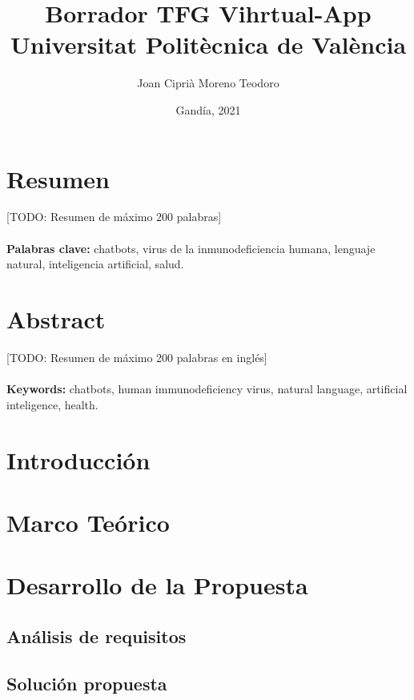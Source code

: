 \documentclass[11pt,a4paper]{book}
\title{
{Borrador TFG Vihrtual-App}\\
{\large Universitat Politècnica de València}\\
}
\author{Joan Ciprià Moreno Teodoro}
\date{Gandía, 2021}
\begin{document}
\maketitle

\chapter*{Resumen}
[TODO: Resumen de máximo 200 palabras]
\\
\\
\textbf{Palabras clave:} chatbots, virus de la inmunodeficiencia humana, lenguaje natural, inteligencia artificial, salud.

\chapter*{Abstract}
[TODO: Resumen de máximo 200 palabras en inglés]
\\
\\
\textbf{Keywords:} chatbots, human immunodeficiency virus, natural language, artificial inteligence, health. 

\tableofcontents

{\listoffigures \let\cleardoublepage\clearpage \listoftables}


\chapter{Introducción}


\chapter{Marco Teórico}


\chapter{Desarrollo de la Propuesta}

\section{Análisis de requisitos}


\section{Solución propuesta}

\end{document}
